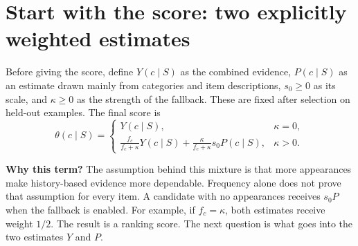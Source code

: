 \documentclass[11pt,a4paper]{article}
\newcommand{\why}{\par\textbf{Why this term?} }
\numberwithin{equation}{section}
\begin{document}
\section{Start with the score: two explicitly weighted estimates}
Before giving the score, define $Y(c\mid S)$ as the combined evidence, $P(c\mid S)$ as
an estimate drawn mainly from categories and item descriptions, $s_0\ge0$ as its scale,
and $\kappa\ge0$ as the strength of the fallback. These are fixed after selection on
held-out examples. The final score is
\begin{equation}\label{theta}
\boxed{\theta(c\mid S)=
\begin{cases}
 Y(c\mid S),&\kappa=0,\\[2pt]
 \displaystyle\frac{f_c}{f_c+\kappa}Y(c\mid S)
 +\frac{\kappa}{f_c+\kappa}s_0P(c\mid S),&\kappa>0.
\end{cases}}
\end{equation}
\why The assumption behind this mixture is that more appearances make history-based evidence more dependable. Frequency alone does not prove that assumption for every item.
A candidate with no appearances receives $s_0P$ when the fallback is enabled. For example,
if $f_c=\kappa$, both estimates receive weight $1/2$. The result is a ranking score.
The next question is what goes into the two estimates $Y$ and $P$.
\end{document}
